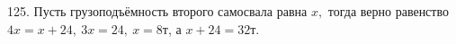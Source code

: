 125. Пусть грузоподъёмность второго самосвала равна $x,$ тогда верно равенство $4x=x+24,\ 3x=24,\ x=8$т, а $x+24=32$т.\\
